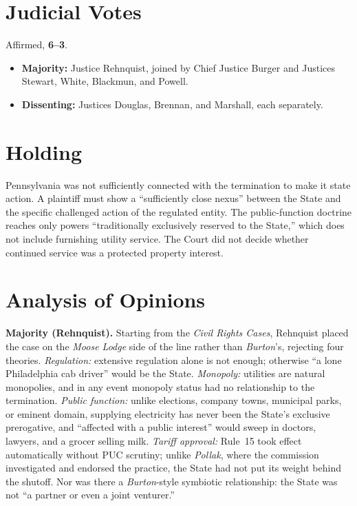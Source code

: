 \documentclass[12pt]{article}
\begin{document}
\section{Judicial Votes}

Affirmed, \textbf{6--3}.
\begin{itemize}
\item \textbf{Majority:} Justice Rehnquist, joined by Chief Justice Burger and Justices Stewart, White, Blackmun, and Powell.
\item \textbf{Dissenting:} Justices Douglas, Brennan, and Marshall, each separately.
\end{itemize}

\section{Holding}

Pennsylvania was not sufficiently connected with the termination to make it state action. A plaintiff must show a ``sufficiently close nexus'' between the State and the specific challenged action of the regulated entity. The public-function doctrine reaches only powers ``traditionally exclusively reserved to the State,'' which does not include furnishing utility service. The Court did not decide whether continued service was a protected property interest.

\section{Analysis of Opinions}

\textbf{Majority (Rehnquist).} Starting from the \textit{Civil Rights Cases}, Rehnquist placed the case on the \textit{Moose Lodge} side of the line rather than \textit{Burton}'s, rejecting four theories. \emph{Regulation:} extensive regulation alone is not enough; otherwise ``a lone Philadelphia cab driver'' would be the State. \emph{Monopoly:} utilities are natural monopolies, and in any event monopoly status had no relationship to the termination. \emph{Public function:} unlike elections, company towns, municipal parks, or eminent domain, supplying electricity has never been the State's exclusive prerogative, and ``affected with a public interest'' would sweep in doctors, lawyers, and a grocer selling milk. \emph{Tariff approval:} Rule~15 took effect automatically without PUC scrutiny; unlike \textit{Pollak}, where the commission investigated and endorsed the practice, the State had not put its weight behind the shutoff. Nor was there a \textit{Burton}-style symbiotic relationship: the State was not ``a partner or even a joint venturer.''
\end{document}
